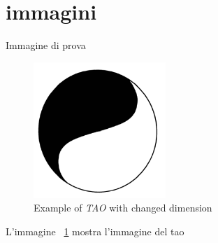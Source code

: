 \documentclass[a4paper]{article}
\begin{document}
\listoffigures

\section{immagini}
Immagine di prova

\begin{figure}[hb]
  \centering
  \includegraphics[width=5cm]{Images/img01.png}
  \caption[Sample of \textit{TAO}]
   {Example of \textit{TAO} with changed dimension}
  \label{fig:tao}
\end{figure}

L'immagine ~\ref{fig:tao} mostra l'immagine del tao
\end{document}
